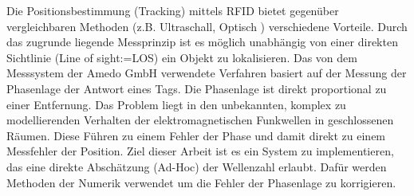 ﻿Die Positionsbestimmung (Tracking) mittels RFID bietet gegenüber vergleichbaren
Methoden (z.B. Ultraschall, Optisch ) verschiedene Vorteile. Durch das
zugrunde liegende Messprinzip ist es möglich unabhängig von einer direkten
Sichtlinie (Line of sight:=LOS) ein Objekt zu lokalisieren. Das von dem
Messsystem der Amedo GmbH verwendete Verfahren basiert auf der Messung der
Phasenlage der Antwort eines Tags. Die Phasenlage ist direkt proportional zu
einer Entfernung. Das Problem liegt in den unbekannten, komplex zu
modellierenden Verhalten der elektromagnetischen Funkwellen in geschlossenen
Räumen. Diese Führen zu einem Fehler der Phase und damit direkt zu einem
Messfehler der Position.
\newline
Ziel dieser Arbeit ist es ein System zu
implementieren, das eine direkte Abschätzung (Ad-Hoc) der Wellenzahl erlaubt.
Dafür werden Methoden der Numerik verwendet um die Fehler der Phasenlage zu
korrigieren.
